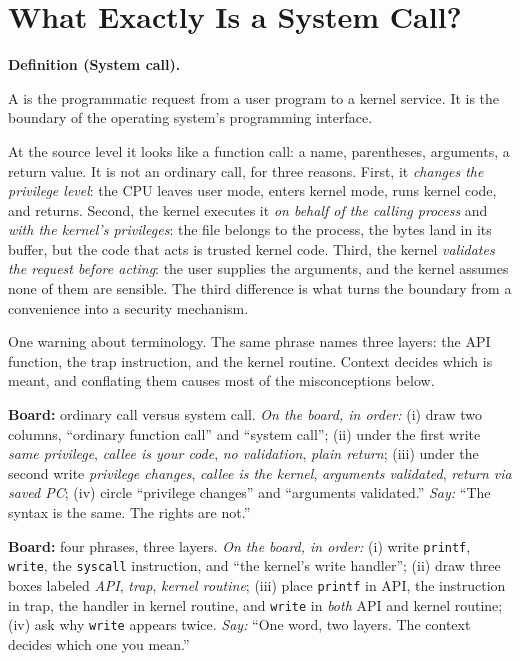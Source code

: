 \documentclass[11pt]{article}
\newenvironment{definitionbox}[1]{%
  \par\noindent\textbf{Definition (#1).}\ \itshape
}{\par\vspace{0.3em}}
\begin{document}
\section{What Exactly Is a System Call?}

\begin{definitionbox}{System call}
A  is the programmatic request from a user program to a kernel service. It is the boundary of the operating system's programming interface.
\end{definitionbox}

At the source level it looks like a function call: a name, parentheses, arguments, a return value. It is not an ordinary call, for three reasons. First, it \emph{changes the privilege level}: the CPU leaves user mode, enters kernel mode, runs kernel code, and returns. Second, the kernel executes it \emph{on behalf of the calling process} and \emph{with the kernel's privileges}: the file belongs to the process, the bytes land in its buffer, but the code that acts is trusted kernel code. Third, the kernel \emph{validates the request before acting}: the user supplies the arguments, and the kernel assumes none of them are sensible. The third difference is what turns the boundary from a convenience into a security mechanism.

One warning about terminology. The same phrase names three layers: the API function, the trap instruction, and the kernel routine. Context decides which is meant, and conflating them causes most of the misconceptions below.

\textbf{Board:} ordinary call versus system call. \emph{On the board, in order:} (i) draw two columns, ``ordinary function call'' and ``system call''; (ii) under the first write \emph{same privilege}, \emph{callee is your code}, \emph{no validation}, \emph{plain return}; (iii) under the second write \emph{privilege changes}, \emph{callee is the kernel}, \emph{arguments validated}, \emph{return via saved PC}; (iv) circle ``privilege changes'' and ``arguments validated.'' \emph{Say:} ``The syntax is the same. The rights are not.''

\textbf{Board:} four phrases, three layers. \emph{On the board, in order:} (i) write \texttt{printf}, \texttt{write}, the \texttt{syscall} instruction, and ``the kernel's write handler''; (ii) draw three boxes labeled \emph{API}, \emph{trap}, \emph{kernel routine}; (iii) place \texttt{printf} in API, the instruction in trap, the handler in kernel routine, and \texttt{write} in \emph{both} API and kernel routine; (iv) ask why \texttt{write} appears twice. \emph{Say:} ``One word, two layers. The context decides which one you mean.''
\end{document}
